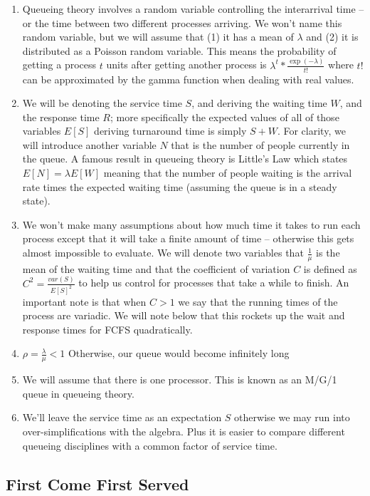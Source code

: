 \begin{enumerate}
\item Queueing theory involves a random variable controlling the interarrival time -- or the time between two different processes arriving.
  We won't name this random variable, but we will assume that (1) it has a mean of $\lambda$ and (2) it is distributed as a Poisson random variable.
  This means the probability of getting a process $t$ units after getting another process is $\lambda^t * \frac{\exp(-\lambda)}{t!}$ where $t!$ can be approximated by the gamma function when dealing with real values.
\item We will be denoting the service time $S$, and deriving the waiting time $W$, and the response time $R$; more specifically the expected values of all of those variables $E[S]$ deriving turnaround time is simply $S + W$.
  For clarity, we will introduce another variable $N$ that is the number of people currently in the queue.
  A famous result in queueing theory is Little's Law which states $E[N] = \lambda E[W]$ meaning that the number of people waiting is the arrival rate times the expected waiting time (assuming the queue is in a steady state).
\item We won't make many assumptions about how much time it takes to run each process except that it will take a finite amount of time -- otherwise this gets almost impossible to evaluate.
We will denote two variables that $\frac{1}{\mu}$ is the mean of the waiting time and that the coefficient of variation $C$ is defined as $C^2 = \frac{var(S)}{E[S]^2}$ to help us control for processes that take a while to finish.
An important note is that when $C > 1$ we say that the running times of the process are variadic. We will note below that this rockets up the wait and response times for FCFS quadratically.
\item $\rho = \frac{\lambda}{\mu} < 1$ Otherwise, our queue would become infinitely long
\item We will assume that there is one processor. This is known as an M/G/1 queue in queueing theory.
\item We'll leave the service time as an expectation $S$ otherwise we may run into over-simplifications with the algebra.
  Plus it is easier to compare different queueing disciplines with a common factor of service time.
\end{enumerate}

\subsection{First Come First Served}

